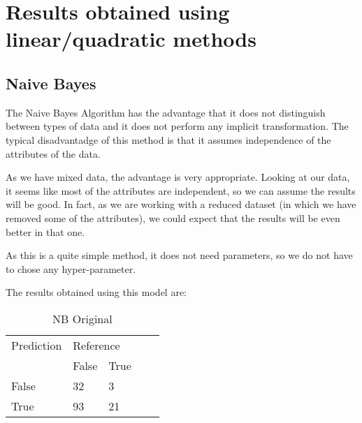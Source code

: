 %
\section{Results obtained using linear/quadratic methods}


\subsection{Naive Bayes}

The Naive Bayes Algorithm has the advantage that it does not distinguish between types of data and it does not perform any implicit transformation. The typical disadvantadge of this method is that it assumes independence of the attributes of the data.

As we have mixed data, the advantage is very appropriate. Looking at our data, it seems like most of the attributes are independent, so we can assume the results will be good. In fact, as we are working with a reduced dataset (in which we have removed some of the attributes), we could expect that the results will be even better in that one.

As this is a quite simple method, it does not need parameters, so we do not have to chose any hyper-parameter.

The results obtained using this model are:



\begin{table}[!htbp]
\centering
\caption{NB Original}
\vspace{0.1cm}
\label{nb-orig}
\begin{tabular}{|l|ll|ll}
\cline{1-3}
Prediction & \multicolumn{2}{l|}{Reference} &  &  \\
           & False          & True          &  &  \\ \cline{2-3}
False      & 32              & 3             &  &  \\
True       & 93              & 21             &  &  \\ \cline{1-3}
\end{tabular}
\end{table}

